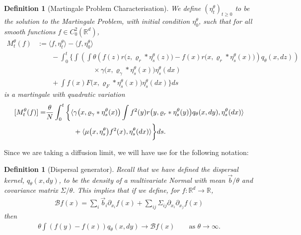 \documentclass[12pt]{article}
\newtheorem{definition}[theorem]{Definition}
\newcommand{\IR}{\mathbb R}
\newcommand{\DG}{\mathcal{B}}  %
\newcommand{\meanq}{\vec b}    %
\newcommand{\covq}{\Sigma}     %
\begin{document}
\begin{definition}[Martingale Problem Characterisation]
    \label{Def: Rescaled Models}
We define $(\eta^{\theta}_t)_{t \geq 0}$ to be the solution to the Martingale Problem,
with initial condition $\eta^{\theta}_0$,
such that for all smooth functions $f \in C^{2}_{0}(\mathbb{R}^d)$,
\begin{equation}
    \label{eq: Pre-limit Martingale Characterisation}
\begin{aligned}
M^{\theta}_t(f)
&:=  \langle f,\eta^{\theta}_t \rangle
        -\langle f,\eta^{\theta}_0 \rangle
 \\ &\qquad {}
 -  \int_{0}^{t}\bigg\{
        \int\left(   \int \theta
     \left(
        f(z)r\big(z,\varrho_{r}*\eta^{\theta}_{s}(z)\big)
            -f(x)r\big(x,\varrho_{r}*\eta^{\theta}_{s}(x)\big)
            \right)
                    q_\theta(x,dz)\right)
        \\ & \qquad \qquad \qquad \qquad {} \times
                            \gamma\big(x,\varrho_{\gamma}*\eta^{\theta}_{s}(x)\big)
                            \eta^{\theta}_{s}(dx)
     \\ & \qquad {} +\int 
     f(x)F\big(x,\varrho_{F}*\eta^{\theta}_{s}(x)\big)
     \eta^{\theta}_{s}(dx)
    \bigg\} ds
\end{aligned}    
\end{equation}
is a martingale with quadratic variation
\begin{equation}
\begin{aligned} \relax
[ M^{\theta}_t(f)] =& 
\frac{\theta}{N} \int_{0}^{t}\bigg\{
\langle \gamma\big(x,\varrho_{\gamma}*\eta^{\theta}_{s}(x)\big)
\int f^2(y)r\big(y,\varrho_{r}*\eta^{\theta}_{s}(y)\big)q_\theta(x,dy) 
,\eta^{\theta}_{s}(dx)\rangle\\
& \qquad \qquad +\langle \mu\big(x,\eta^{\theta}_{s}\big)f^2(x) 
,\eta^{\theta}_{s}(dx)\rangle \bigg\}ds. 
\end{aligned}    
\end{equation}


\end{definition}

Since we are taking a diffusion limit,
we will have use for the following notation:

\begin{definition}[Dispersal generator]
    \label{def:dispersal_generator}
    Recall that we have defined the dispersal kernel,
    $q_\theta(x, dy)$,
    to be the density of a multivariate Normal
    with mean $\meanq/\theta$ and covariance matrix $\covq/\theta$.
    This implies that if we define, for $f : \IR^d \to \IR$,
    \begin{align}
    \DG f(x) = \sum_i \meanq_i \partial_{x_i} f(x)
        + \sum_{ij} \covq_{ij} \partial_{x_i} \partial_{x_j} f(x)
    \end{align}
    then
    \begin{align}
        \theta \int \left(
            f(y) - f(x)
        \right) q_\theta(x, dy)
    \to \DG f(x) 
        \qquad \text{as } \theta \to \infty .
    \end{align}
\end{definition}
\end{document}
